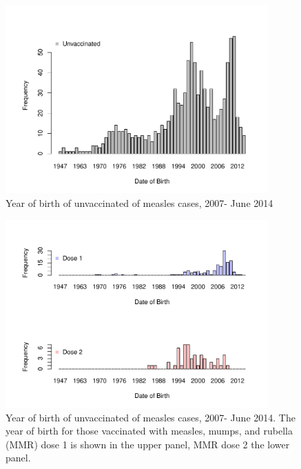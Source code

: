 \documentclass{article}
\begin{document}
\begin{figure}
\begin{center}
     \includegraphics[width=0.9\textwidth]{dob_vacc_unvac.pdf}
\end{center}
\caption{Year of birth of unvaccinated of measles cases, 2007- June 2014}
\label{fig:yearandvac}
\end{figure}

\begin{figure}
\begin{center}
     \includegraphics[width=0.9\textwidth]{dob_vacc_dose.pdf}
\end{center}
\caption{Year of birth of unvaccinated of measles cases, 2007- June 2014. The year of birth for those vaccinated with measles, mumps, and rubella (MMR) dose 1 is shown in the upper panel, MMR dose 2 the lower panel.}
\label{fig:yearandvacf}
\end{figure}
\end{document}
